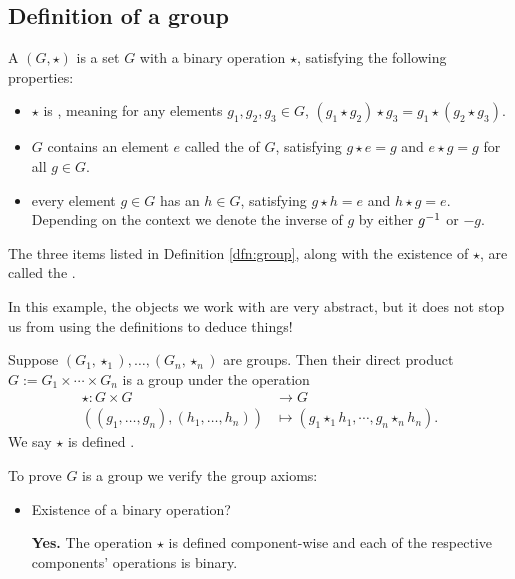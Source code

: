 \documentclass[../algebraNotesMSRI-UP2016.tex]{subfiles}
\begin{document}
\subsection[\subsecname]{Definition of a group}
\begin{frame}{\subsecname}
\begin{dfn}\label{dfn:group}
A  $(G,\star)$ is a set $G$ with a binary operation $\star$, satisfying the following properties:
\begin{itemize}
\item $\star$ is , meaning for any elements $g_1,g_2,g_3\in G$, $(g_1\star g_2)\star g_3=g_1\star (g_2\star g_3)$.
\item $G$ contains an element $e$ called the  of $G$, satisfying $g\star e=g$ and $e\star g=g$ for all $g\in G$.
\item every element $g\in G$ has an  $h\in G$, satisfying $g\star h=e$ and $h\star g=e$.  Depending on the context we denote the inverse of $g$ by either $g^{-1}$ or $-g$.    
\end{itemize}
\end{dfn}

\smallGap
The three items listed in Definition \ref{dfn:group}, along with the existence of $\star$, are called the .
\end{frame}

\begin{frame}
In this example, the objects we work with are very abstract, but it does not stop us from using the definitions to deduce things!

\smallGap
\begin{ex}
Suppose $(G_1,\star_1),\dots,(G_n,\star_n)$ are groups.  Then their direct product $G:=G_1\times\cdots\times G_n$ is a group under the operation 
\begin{align*}
\star: G\times G &\to G \\
	\left((g_1,\dots,g_n),(h_1,\dots,h_n)\right) &\mapsto
		\left(g_1\star_1 h_1,\cdots, g_n\star_n h_n\right).
\end{align*}
We say $\star$ is defined .  
\end{ex}

\smallGap
To prove $G$ is a group we verify the group axioms:
\begin{itemize}
\item Existence of a binary operation?

\textbf{Yes.}  The operation $\star$ is defined component-wise and each of the respective components' operations is binary.
\end{itemize}
\end{frame}
\end{document}
